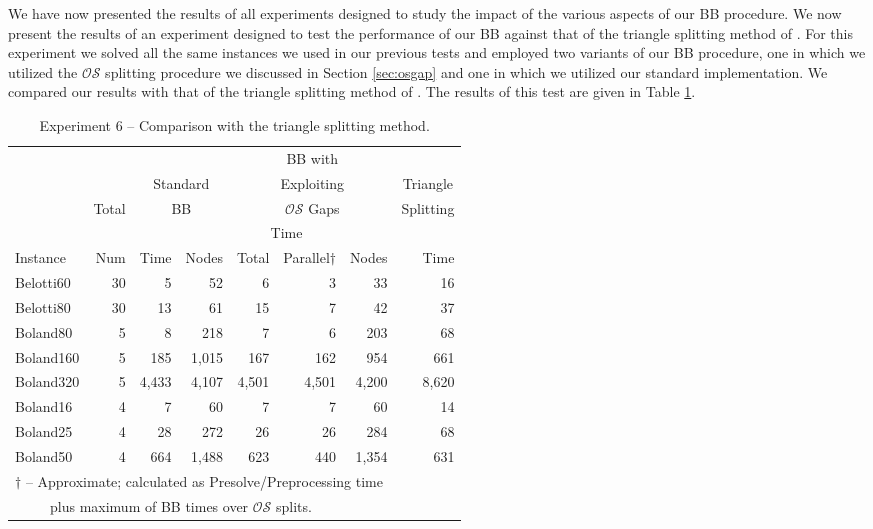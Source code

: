 \documentclass[11.5pt]{article}
\newcommand{\OS}{\mathcal{OS}}
\newcommand\Tstrut{\rule{0pt}{3ex}}
\begin{document}
We have now presented the results of all experiments designed to study the impact of the various aspects of our BB procedure. We now present the results of an experiment designed to test the performance of our BB against that of the triangle splitting method of \citep{boland2015acriterion}. For this experiment we solved all the same instances we used in our previous tests and employed two variants of our BB procedure, one in which we utilized the $\OS$ splitting procedure we discussed in Section \ref{sec:osgap} and one in which we utilized our standard implementation. We compared our results with that of the triangle splitting method of \citep{boland2015acriterion}. The results of this test are given in Table \ref{table_gaps_ts}.

 \begin{table}[h!]
\centering
\caption{Experiment 6 -- Comparison with the triangle splitting method.}\label{table_gaps_ts}
\begin{tabular}{l|r|rr|rrr|r}
\toprule
 &  & \multicolumn{2}{c}{} & \multicolumn{3}{c}{BB with} & \multicolumn{1}{c}{}\\ 
 &  & \multicolumn{2}{c}{Standard} & \multicolumn{3}{c}{Exploiting} & \multicolumn{1}{c}{Triangle}\\
  & Total & \multicolumn{2}{c}{BB} & \multicolumn{3}{c}{$\OS$ Gaps} & \multicolumn{1}{c}{Splitting}\\
\cmidrule(r){3-4}
\cmidrule(r){5-7}
\cmidrule(r){8-8}
 &  &  &  & \multicolumn{2}{c}{Time} &   \\
\cmidrule(r){5-6}
Instance & Num & Time & Nodes & Total & Parallel$\dagger$ & Nodes & Time  \\ 
\midrule
Belotti60 & 30 & 5 & 52 & 6 & 3 & 33 & 16 \\
Belotti80 & 30 & 13 & 61 & 15 & 7 & 42 & 37  \\
\midrule
Boland80 & 5 & 8 & 218 & 7 & 6 & 203 & 68\\
Boland160 & 5 & 185 & 1,015 & 167 & 162 & 954 & 661  \\
Boland320 & 5 & 4,433 & 4,107 & 4,501 & 4,501 & 4,200 & 8,620 \\
Boland16 & 4 & 7 & 60 & 7 & 7 & 60 & 14 \\
Boland25 & 4 & 28 & 272 & 26 & 26 & 284 & 68  \\
Boland50 & 4 & 664 & 1,488 & 623 & 440 & 1,354 & 631  \\
\bottomrule
\multicolumn{8}{l}{\scriptsize $\dagger$ -- Approximate; calculated as Presolve/Preprocessing time \Tstrut}\\ \multicolumn{8}{l}{\scriptsize ~~~~~plus maximum of BB times over $\OS$ splits.\Tstrut}
\end{tabular}
\end{table}
\end{document}
